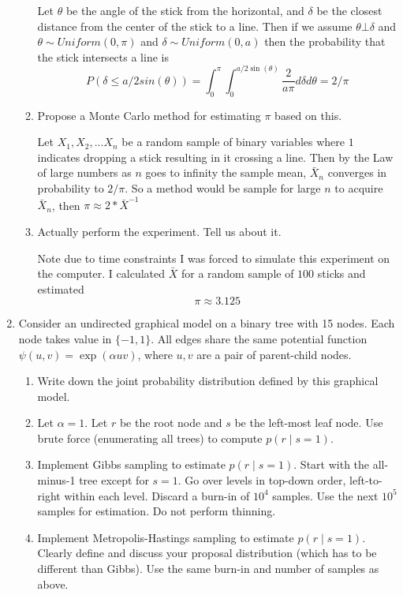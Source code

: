 \documentclass{article}
\begin{document}
\begin{enumerate}
\begin{enumerate}
\color{red}
Let $\theta$ be the angle of the stick from the horizontal, and $\delta$ be the closest distance from the center of the stick to a line. Then
if we assume $\theta \bot \delta$ and $\theta \sim Uniform(0,\pi) $ and $\delta \sim Uniform(0,a)$ then the probability that the stick intersects a line is
$$
P(\delta \leq a /2 sin(\theta)) = \int_0^\pi \int_0^{a/2\sin(\theta)} \frac{2}{a\pi} d \delta d\theta = 2/\pi
$$

\color{black}

\item Propose a Monte Carlo method for estimating $\pi$ based on this. 

\color{red}
Let $X_1, X_2 , ... X_n$ be a random sample of binary variables where $1$ indicates dropping a stick resulting in it crossing a line. Then by the Law of large numbers as $n$ goes to infinity the sample mean, $\bar{X}_n$ converges in probability to $2/\pi$. So a method would be sample for large $n$ to acquire $\bar{X}_n$, 
then $\pi \approx 2 * \bar{X}^{-1} $
\color{black}

\item Actually perform the experiment.  Tell us about it.

\color{red}
Note due to time constraints I was forced to simulate this experiment on the computer. I calculated $\bar{X}$ for a random sample of $100$ sticks and estimated 
$$
\pi \approx 3.125
$$

\color{black}


\end{enumerate}

\item 
Consider an undirected graphical model on a binary tree with 15 nodes.
Each node takes value in $\{-1,1\}$.
All edges share the same potential function $\psi(u,v) = \exp(\alpha u v)$, where $u,v$ are a pair of parent-child nodes.

  \begin{enumerate}
  \item Write down the joint probability distribution defined by this graphical model.
  \item Let $\alpha=1$.  Let $r$ be the root node and $s$ be the left-most leaf node.
  Use brute force (enumerating all trees) to compute $p(r \mid s=1)$.
  \item Implement Gibbs sampling to estimate $p(r \mid s=1)$.  Start with the all-minus-1 tree except for $s=1$.  Go over levels in top-down order, left-to-right within each level.
  Discard a burn-in of $10^4$ samples.  Use the next $10^5$ samples for estimation.  Do not perform thinning.
  \item Implement Metropolis-Hastings sampling to estimate $p(r \mid s=1)$.  Clearly define and discuss your proposal distribution (which has to be different than Gibbs).  Use the same burn-in and number of samples as above.
  \end{enumerate}



\end{enumerate}
\end{document}
